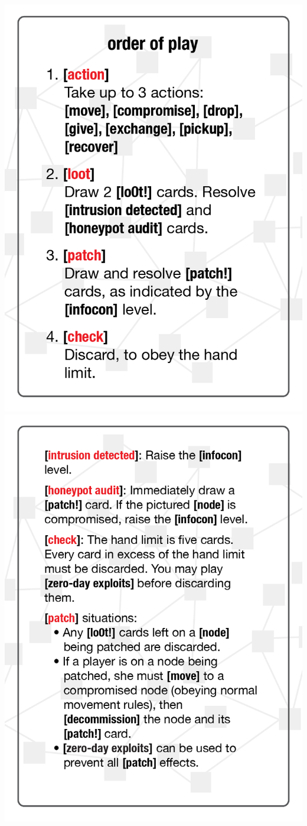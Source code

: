 \documentclass{letter}
\begin{document}
\includegraphics{rules/rule-card_front}
\includegraphics{rules/rule-card_back} \\
\end{document}
